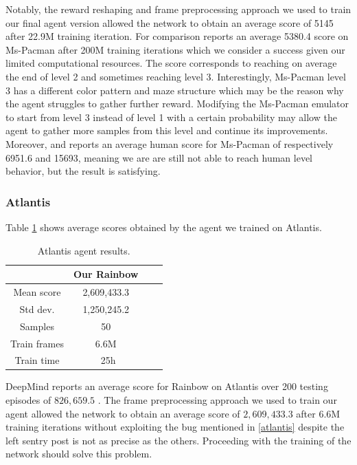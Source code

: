 \documentclass[10pt,twocolumn,letterpaper]{article}
\begin{document}
Notably, the reward reshaping and frame preprocessing approach we used to train our final agent version allowed the network to obtain an average score of 5145 after 22.9M training iteration. For comparison \cite{DBLP:journals/corr/abs-1710-02298} reports an average 5380.4 score on Ms-Pacman after 200M training iterations which we consider a success given our limited computational resources.
The score corresponds to reaching on average the end of level 2 and sometimes reaching level 3. Interestingly, Ms-Pacman level 3 has a different color pattern and maze structure which may be the reason why the agent struggles to gather further reward. Modifying the Ms-Pacman emulator to start from level 3 instead of level 1 with a certain probability may allow the agent to gather more samples from this level and continue its improvements.
Moreover, \cite{DBLP:journals/corr/WangFL15} and \cite{humancontrol} reports an average human score for Ms-Pacman of respectively 6951.6 and 15693, meaning we are are still not able to reach human level behavior, but the result is satisfying.

\subsubsection{Atlantis}
Table \ref{tab:atlantis_results} shows average scores obtained by the agent we trained on Atlantis. 

\begin{table}
	\begin{center}
		\begin{tabular}{ |c|c|c|c| } 
			\hline
			& Our Rainbow \\ 
			\hline
			Mean score & 2,609,433.3 \\
			Std dev. & 1,250,245.2 \\
			Samples & 50 \\
			Train frames & 6.6M \\
			Train time & ~25h \\
			\hline
		\end{tabular}
	\end{center}
	\caption{Atlantis agent results.}
	\label{tab:atlantis_results}
\end{table}

DeepMind reports an average score for Rainbow on Atlantis over 200 testing episodes of $826,659.5$ \cite{DBLP:journals/corr/abs-1710-02298}. The frame preprocessing approach we used to train our agent allowed the network to obtain an average score of $2,609,433.3$ after $6.6$M training iterations without exploiting the bug mentioned in \ref{atlantis} despite the left sentry post is not as precise as the others.  Proceeding with the training of the network should solve this problem.
\end{document}
